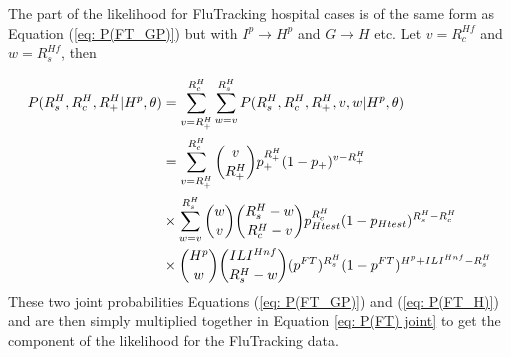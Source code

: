 The part of the likelihood for FluTracking hospital cases is of the same form as Equation (\ref{eq: P(FT_GP)}) but with $I^p \rightarrow H^p$ and $G \rightarrow H$ etc. Let $v=R_c^{Hf}$ and $w=R_s^{Hf}$, then

\begin{align} \notag
P(R_s^H, R_c^H, R_+^H | H^p, \theta) &= \sum_{v=R_{+}^H}^{R_{c}^H} \sum_{w=v}^{R_{s}^H} P(R_s^H, R_c^H, R_+^H, v, w | H^p, \theta) \\ \notag
&= \sum_{v=R_{+}^H}^{R_{c}^H} \binom{v}{R_{+}^H} p_+^{R_{+}^H}(1-p_+)^{v-R_{+}^H} \\ \notag
& \times \sum_{w=v}^{R_{s}^H} \binom{w}{v} \binom{R_{s}^H-w}{R_{c}^H-v} p_{Htest}^{R_{c}^H}(1-p_{Htest})^{R_{s}^H-R_{c}^H} \\ \label{eq: P(FT_H)}
& \times \binom{H^p}{w} \binom{ILI^{Hnf}}{R_{s}^H-w} (p^{FT})^{R_{s}^H}(1-p^{FT})^{H^p+ILI^{Hnf} - R_{s}^H}
\end{align}
These two joint probabilities Equations (\ref{eq: P(FT_GP)}) and (\ref{eq: P(FT_H)}) and are then simply multiplied together in Equation \ref{eq: P(FT) joint} to get the component of the likelihood for the FluTracking data.

